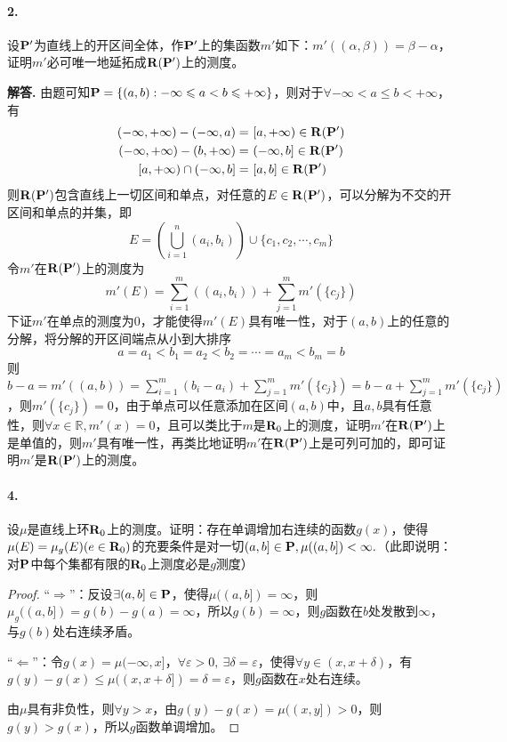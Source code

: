 \documentclass[12pt, a4paper, oneside]{ctexart}
\newenvironment{solution}{\par\noindent\textbf{解答. }}{\bigskip\par}
\begin{document}
\paragraph{2.}设$\P'$为直线上的开区间全体，作$\P'$上的集函数$m'$如下：$m'((\alpha,\beta))=\beta-\alpha$，证明$m'$必可唯一地延拓成$\R(\P')$上的测度。
\begin{solution}
    由题可知$\P = \{(a,b):-\infty\leqslant a<b\leqslant +\infty\}$，则对于$\forall -\infty < a \leqslant b < +\infty$，有
    \begin{equation*}
        \begin{aligned}
            (-\infty,+\infty) - (-\infty, a) =&\ [a,+\infty)\in \R(\P')\\
            (-\infty, +\infty) - (b,+\infty) = &\ (-\infty, b]\in \R(\P')\\
            [a,+\infty)\cap (-\infty, b] =&\ [a,b]\in \R(\P')
        \end{aligned}
    \end{equation*}
    则$\R(\P')$包含直线上一切区间和单点，对任意的$E\in \R(\P')$，可以分解为不交的开区间和单点的并集，即
    \begin{equation*}
        E = \left(\bigcup_{i=1}^n(a_i,b_i)\right)\cup\{c_1,c_2,\cdots, c_m\}
    \end{equation*}
    令$m'$在$\R(\P')$上的测度为
    \begin{equation*}
        m'(E) = \sum_{i=1}^m((a_i,b_i)) + \sum_{j=1}^mm'(\{c_j\})
    \end{equation*}
    下证$m'$在单点的测度为$0$，才能使得$m'(E)$具有唯一性，对于$(a,b)$上的任意的分解，将分解的开区间端点从小到大排序
    \begin{equation*}
        a=a_1<b_1=a_2<b_2=\cdots =a_m<b_m=b
    \end{equation*}
    则$b-a=m'((a,b)) = \sum_{i=1}^m(b_i-a_i)+\sum_{j=1}^mm'(\{c_j\}) = b-a +\sum_{j=1}^mm'(\{c_j\})$，则$m'(\{c_j\})=0$，由于单点可以任意添加在区间$(a,b)$中，且$a,b$具有任意性，则$\forall x\in\mathbb{R}, m'(x) = 0$，且可以类比于$m$是$\R_0$上的测度，证明$m'$在$\R(\P')$上是单值的，则$m'$具有唯一性，再类比地证明$m'$在$\R(\P')$上是可列可加的，即可证明$m'$是$\R(\P')$上的测度。
\end{solution}
\paragraph{4.}设$\mu$是直线上环$\R_0$上的测度。证明：存在单调增加右连续的函数$g(x)$，使得$\mu(E)  = \mu_g(E)(e\in\R_0)$的充要条件是对一切$(a,b]\in \P,\mu((a,b])<\infty.$（此即说明：对$\P$中每个集都有限的$\R_0$上测度必是$g$测度）
\begin{proof}
    “$\Rightarrow$”：反设$\exists(a, b]\in \P$，使得$\mu((a, b]) = \infty$，则$\mu_g((a,b]) = g(b)-  g(a) = \infty$，所以$g(b) = \infty$，则$g$函数在$b$处发散到$\infty$，与$g(b)$处右连续矛盾。

    “$\Leftarrow$”：令$g(x) = \mu(-\infty,x]$，$\forall \varepsilon > 0,\ \exists \delta = \varepsilon$，使得$\forall y  \in(x,x+\delta)$，有$g(y)-g(x)\leqslant \mu((x,x+\delta]) = \delta = \varepsilon$，则$g$函数在$x$处右连续。

    由$\mu$具有非负性，则$\forall y > x$，由$g(y) - g(x) = \mu((x, y]) > 0$，则$g(y) > g(x)$，所以$g$函数单调增加。
\end{proof}
\end{document}
